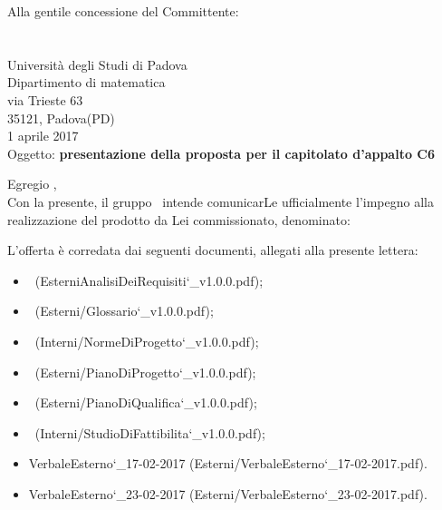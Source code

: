\documentclass[a4paper,12pt]{article}
\author{KaleidosCode}
\date{1/4/2017}	%
\begin{document}
 	\begin{titlepage}
 		\centering
 		\logo
 		\vspace{1.2cm}
 		\flushright Alla gentile concessione del Committente: \\
 		\vardanega \\
 		\cardin\\
 		Università degli Studi di Padova \\
 		Dipartimento di matematica\\
 		via Trieste 63\\
 		35121, Padova(PD)\\
 		\vspace{0.5cm}
 		1 aprile 2017\\
 		\vspace{1.4cm}
 		\flushleft
 		Oggetto: \textbf{presentazione della proposta per il capitolato d’appalto C6}
 		\vspace{0.4cm}
		\flushleft	\responsabilediprogetto\\
		\kaleidoscode
		
		\vspace{0.6cm}
		Egregio \vardanega ,\\
		\vspace{0.4cm}
		Con la presente, il gruppo \kaleidoscode\ intende comunicarLe ufficialmente l’impegno alla realizzazione del prodotto da Lei commissionato, denominato:
		
		\progetto
		
		L’offerta è corredata dai seguenti documenti, allegati alla presente lettera:
		\begin{itemize}
			\item \analisideirequisitiv\  (EsterniAnalisiDeiRequisiti\char`_v1.0.0.pdf);
			\item \glossariov\  (Esterni/Glossario\char`_v1.0.0.pdf);
			\item \normediprogettov\  (Interni/NormeDiProgetto\char`_v1.0.0.pdf);
			\item \pianodiprogettov\  (Esterni/PianoDiProgetto\char`_v1.0.0.pdf);
			\item \pianodiqualificav\  (Esterni/PianoDiQualifica\char`_v1.0.0.pdf);
			\item \studiodifattibilitav\  (Interni/StudioDiFattibilita\char`_v1.0.0.pdf);
			\item VerbaleEsterno\char`_17-02-2017 (Esterni/VerbaleEsterno\char`_17-02-2017.pdf).
			\item VerbaleEsterno\char`_23-02-2017  (Esterni/VerbaleEsterno\char`_23-02-2017.pdf).
\end{itemize}
		

\end{titlepage}
\end{document}
